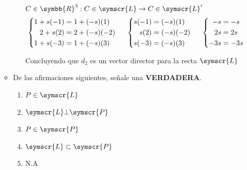 \documentclass{article}
\def\fancyL{\symscr{L}}
\def\fancyP{\symscr{P}}
\def\realR{\symbb{R}}
\begin{document}
\begin{enumerate}
\begin{itemize}
\begin{enumerate}[label=\listAlph]
\begin{mathcase}{\(C \in \realR^3: C \in \fancyL \rightarrow C \in \fancyL'\)}
                            \[
                                \left\{
                                \begin{aligned}
                                    1 + s(-1) &= 1 + (-s)(1) \\
                                    2 + s(2) &= 2 + (-s)(-2) \\
                                    1 + s(-3) &= 1 + (-s)(3)
                                \end{aligned}
                                \right.
                                \hspace{0.5cm}
                                \left\{
                                \begin{aligned}
                                    s(-1) &= (-s)(1) \\
                                    s(2) &= (-s)(-2) \\
                                    s(-3) &= (-s)(3)
                                \end{aligned}
                                \right.
                                \hspace{0.5cm}
                                \left\{
                                \begin{aligned}
                                    -s &= -s \\
                                    2s &= 2s \\
                                    -3s &= -3s
                                \end{aligned}
                                \right.
                            \]
                        \end{mathcase}
                        Concluyendo que \(d_2\) es un vector director para la recta \(\fancyL\)
                \end{enumerate}
            \item De las afirmaciones siguientes, señale una \textbf{VERDADERA}.
                \begin{enumerate}
                    \item \(P \in \fancyL\)
                    \item \(\fancyL \bot \fancyP\)
                    \item \(P \in \fancyP\)
                    \item \(\fancyL \subset \fancyP\)
                    \item N.A

\end{enumerate}
\end{itemize}
\end{enumerate}
\end{document}
